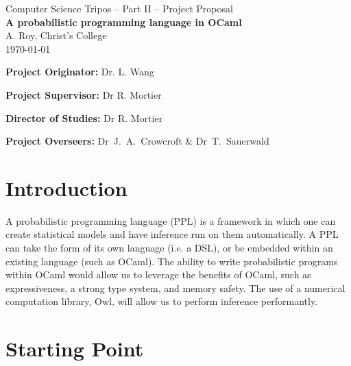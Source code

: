 
\vfil


\begin{center}
      {\Large Computer Science Tripos -- Part II -- Project Proposal} \\
      \vspace{0.4in}
      {\huge \bf A probabilistic programming language in OCaml } \\
      \vspace{0.4in}
      {\large A. Roy, Christ's College} \\
      \vspace{0.1in}
      {\large \today} \\

\end{center}
\vspace{0.4in}

\vfil

\textbf{Project Originator:} Dr. L. Wang
\vspace{0.1in}

\textbf{Project Supervisor:} Dr R. Mortier
\vspace{0.1in}

\textbf{Director of Studies:} Dr R. Mortier
\vspace{0.1in}

\textbf{Project Overseers:} Dr~J.~A.~Crowcroft  \& Dr~T.~Sauerwald

\vfil


\section*{Introduction}

A probabilistic programming language (PPL) is a framework in which one can create statistical models and have inference run on them automatically. A PPL can take the form of its own language (i.e. a DSL), or be embedded within an existing language (such as OCaml). The ability to write probabilistic programs within OCaml would allow us to leverage the benefits of OCaml, such as expressiveness, a strong type system, and memory safety. The use of a numerical computation library, Owl, will allow us to perform inference performantly.


\section*{Starting Point}


